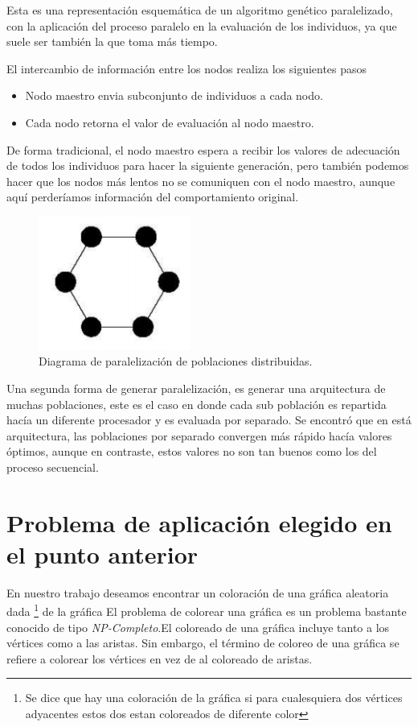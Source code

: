 \documentclass{article}
\begin{document}
Esta es una representación esquemática de un algoritmo genético paralelizado, con la aplicación del proceso paralelo en la evaluación de los individuos, ya que suele ser también la que toma más tiempo. 

    El intercambio de información entre los nodos 
realiza los siguientes pasos
\begin{itemize}
    \item Nodo maestro envia subconjunto de individuos a cada nodo. 
    \item Cada nodo retorna el valor de evaluación al nodo maestro.
    
\end{itemize}
De forma tradicional, el nodo maestro espera a recibir los valores de adecuación de todos los individuos para hacer la siguiente generación, pero también podemos hacer que los nodos más lentos no se comuniquen con el nodo maestro, aunque aquí perderíamos información del comportamiento original.

\begin{figure}[h!]
    \centering
    \includegraphics[width=5cm]{imgs/arqui2.png}
    \caption{Diagrama de paralelización de poblaciones distribuidas.}
    \label{fig:my_label}
\end{figure}




Una segunda forma de generar paralelización, es generar una arquitectura de muchas poblaciones, este es el caso en donde cada sub población es repartida hacía un diferente procesador y es evaluada por separado. Se encontró que en está arquitectura, las poblaciones por separado convergen más rápido hacía valores óptimos, aunque en contraste, estos valores no son tan buenos como los del proceso secuencial.\cite{parallelgenetic2011}

\section{Problema de aplicación elegido en el punto anterior}

En nuestro trabajo deseamos encontrar un coloración de una gráfica aleatoria dada \footnote{Se dice que hay una coloración de la gráfica si para cualesquiera dos vértices adyacentes estos dos estan coloreados de diferente color} de la gráfica
El problema de colorear una gr\'afica es un problema bastante conocido de tipo \textit{NP-Completo}.El coloreado de una gr\'afica incluye tanto a los v\'ertices como a las aristas. Sin embargo, el t\'ermino de coloreo de una gr\'afica se refiere a colorear los v\'ertices en vez de al coloreado de aristas.\\ 
\end{document}
